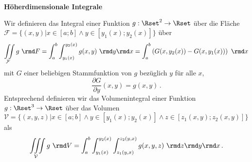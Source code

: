 \documentclass[a4paper,10pt]{article}
\begin{document}
\pagebreak
{\bf Höherdimensionale Integrale}

%
%
Wir definieren das Integral einer Funktion $g:\Rset^2\to\Rset$ über die
Fläche\\ $\mathcal{F}=\{(x,y)|x\in[a;b]\wedge y\in[y_1(x);y_2(x)]\}$ über
\[
\iint\limits_{\mathcal{F}} g~\rmd F = \int_a^b\int_{y_1(x)}^{y_2(x)}g(x,y)~\rmd y\rmd x
= \int_a^b\left(G(x,y_2(x))-G(x,y_1(x))\right)~\rmd x
\]
mit $G$ einer beliebigen Stammfunktion von $g$ bezüglich $y$ für alle $x$,
\[
\frac{\partial G}{\partial y}(x,y)=g(x,y)\,.
\]
Entsprechend definieren wir das Volumenintegral einer Funktion
$g:\Rset^3\to\Rset$ über das Volumen
$\mathcal{V}=\{(x,y,z)|x\in[a;b]\wedge y\in[y_1(x);y_2(x)]\wedge z\in[z_1(x,y);z_2(x,y)]\}$ als
\[
\iiint\limits_{\mathcal{V}} g~\rmd V = \int_a^b\int_{y_1(x)}^{y_2(x)}\int_{z_1(y,x)}^{z_2(y,x)}g(x,y,z)~\rmd z\rmd y\rmd x\,.
\]
\end{document}
